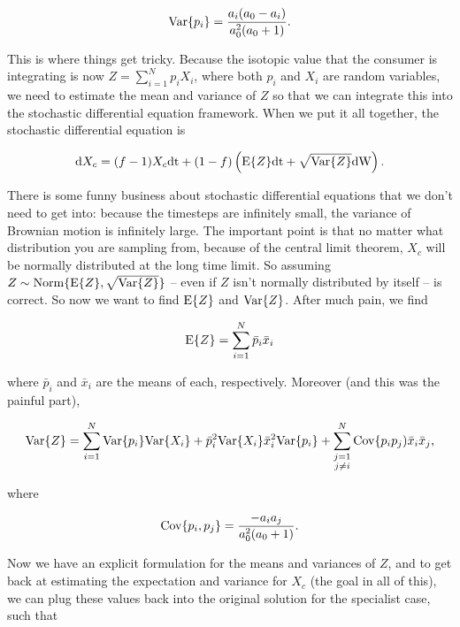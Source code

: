 \documentclass[11pt]{article}
\begin{document}
\begin{equation}
	{\rm Var}\{p_i\} = \frac{a_i(a_0 - a_i)}{a_0^2(a_0 + 1)}.
\end{equation}

This is where things get tricky.
Because the isotopic value that the consumer is integrating is now $Z = \sum_{i=1}^Np_iX_i$, where both $p_i$ and $X_i$ are random variables, we need to estimate the mean and variance of $Z$ so that we can integrate this into the stochastic differential equation framework.
When we put it all together, the stochastic differential equation is

\begin{equation}
{\rm d}X_c = (f-1)X_c{\rm dt} + (1-f)\left({\rm E}\{Z\} {\rm dt} + \sqrt{{\rm Var}\{Z\}}{\rm dW}\right).
\end{equation}

There is some funny business about stochastic differential equations that we don't need to get into: because the timesteps are infinitely small, the variance of Brownian motion is infinitely large.
The important point is that no matter what distribution you are sampling from, because of the central limit theorem, $X_c$ will be normally distributed at the long time limit.
So assuming $Z \sim {\rm Norm}\{{\rm E}\{Z\}, \sqrt{{\rm Var}\{Z\}}\}$ -- even if $Z$ isn't normally distributed by itself -- is correct.
So now we want to find ${\rm E}\{Z\}$ and ${\rm Var}\{Z\}$.
After much pain, we find

\begin{equation}
	{\rm E}\{Z\} = \sum_{i=1}^N \bar{p}_i \bar{x}_i	
\end{equation}

\noindent where $\bar{p}_i$ and $\bar{x}_i$ are the means of each, respectively.
Moreover (and this was the painful part),

\begin{equation}
	{\rm Var}\{Z\} = \sum_{i=1}^N {\rm Var}\{p_i\}{\rm Var}\{X_i\} + \bar{p}_i^2{\rm Var}\{X_i\} \bar{x}_i^2 {\rm Var}\{p_i\} + \sum_{\substack{
	j=1 \\
	j \neq i}							
	}^N {\rm Cov}\{p_ip_j)\bar{x}_i\bar{x}_j,
\end{equation}

\noindent where  

\begin{equation}
	{\rm Cov}\{p_i,p_j\} = \frac{-a_ia_j}{a_0^2(a_0 + 1)}.
\end{equation}

Now we have an explicit formulation for the means and variances of $Z$, and to get back at estimating the expectation and variance for $X_c$ (the goal in all of this), we can plug these values back into the original solution for the specialist case, such that
\end{document}
